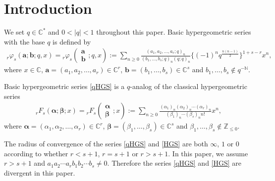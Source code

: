 \section{Introduction}
We set $q\in\mathbb{C}^*$ and $0<|q|<1$ throughout this paper. Basic hypergeometric series with the base $q$ is defined by
\begin{gather}\label{qHGS}
{}_r\varphi_s\left(\bm{a};\bm{b};q,x\right)=
{}_r\varphi_s\left(\begin{matrix}\bm{a}\\ \bm{b}\end{matrix};q,x\right)
:=\sum_{n\ge0} \frac{(a_1,a_2,\ldots,a_r;q)_n}{(b_1,\ldots,b_s;q)_n(q;q)_n}\big\{(-1)^nq^{\frac{n(n-1)}{2}}\big\}^{1+s-r}x^n,
\end{gather}
where $x\in\mathbb{C}$, $\bm{a}=(a_1,a_2,\ldots,a_r)\in\mathbb{C}^r$, $\bm{b}=(b_1,\ldots,b_s)\in\mathbb{C}^s$ and $b_1,\ldots,b_s\notin q^{-\mathbb{N}}$.

Basic hypergeometric series \eqref{qHGS} is a $q$-analog of the classical hypergeometric series
\begin{gather}\label{HGS}
{}_rF_s\left(\bm{\alpha};\bm{\beta};x\right)=
{}_rF_s\left(\begin{matrix}
\bm{\alpha}\\
\bm{\beta}
\end{matrix};x\right)
:=\sum_{n\ge0}\frac{(\alpha_1)_n(\alpha_2)_n\cdots(\alpha_r)_n}{(\beta_1)_n\cdots(\beta_s)_nn!}x^n,
\end{gather}
where $\bm{\alpha}=(\alpha_1,\alpha_2,\ldots,\alpha_r)\in\mathbb{C}^r$, $\bm{\beta}=(\beta_1,\ldots,\beta_s)\in\mathbb{C}^s$ and $\beta_1,\ldots,\beta_s\notin \mathbb{Z}_{\le0}$.

The radius of convergence of the series \eqref{qHGS} and \eqref{HGS} are both $\infty$, $1$ or $0$ according to whether $r<s+1$, $r=s+1$ or $r>s+1$. In this paper, we assume $r>s+1$ and $a_1a_2\cdots a_rb_1b_2\cdots b_s\neq0$. Therefore the series \eqref{qHGS} and \eqref{HGS} are divergent in this paper.

